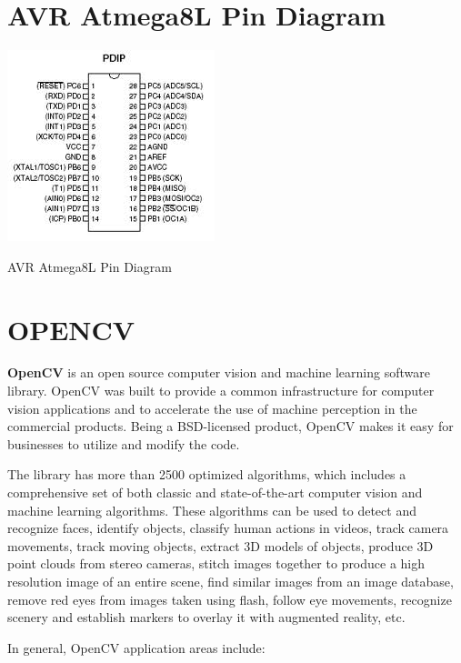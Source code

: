\documentclass[12pt, a4paper]{article}
\begin{document}
\begin{appendices}
\section{AVR Atmega8L Pin Diagram}
\begin{appendixfig}
\centering
\includegraphics[scale=1.00]{avr.jpeg}
\caption{AVR Atmega8L Pin Diagram}
\label{}
\end{appendixfig}

\newpage
\section{OPENCV}
\textbf{\ac{OpenCV}} is an open source computer vision and machine learning software library. \ac{OpenCV} was built to provide a common infrastructure for computer vision applications and to accelerate the use of machine perception in the commercial products. Being a BSD-licensed product, \ac{OpenCV} makes it easy for businesses to utilize and modify the code.

The library has more than 2500 optimized algorithms, which includes a comprehensive set of both classic and state-of-the-art computer vision and machine learning algorithms. These algorithms can be used to detect and recognize faces, identify objects, classify human actions in videos, track camera movements, track moving objects, extract \ac{3D} models of objects, produce \ac{3D} point clouds from stereo cameras, stitch images together to produce a high resolution image of an entire scene, find similar images from an image database, remove red eyes from images taken using flash, follow eye movements, recognize scenery and establish markers to overlay it with augmented reality, etc.

In general, \ac{OpenCV} application areas include:


\end{appendices}
\end{document}
